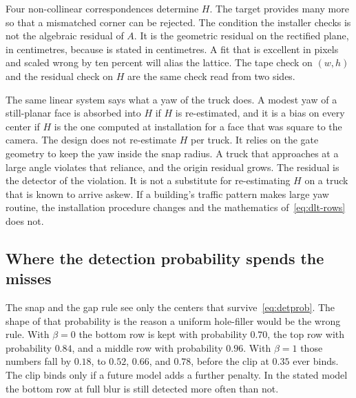 Four non-collinear correspondences determine $H$. The target provides many more so that a mismatched corner can be rejected. The condition the installer checks is not the algebraic residual of $A$. It is the geometric residual on the rectified plane, in centimetres, because  is stated in centimetres. A fit that is excellent in pixels and scaled wrong by ten percent will alias the lattice. The tape check on $(w,h)$ and the residual check on $H$ are the same check read from two sides.

The same linear system says what a yaw of the truck does. A modest yaw of a still-planar face is absorbed into $H$ if $H$ is re-estimated, and it is a bias on every center if $H$ is the one computed at installation for a face that was square to the camera. The design does not re-estimate $H$ per truck. It relies on the gate geometry to keep the yaw inside the snap radius. A truck that approaches at a large angle violates that reliance, and the origin residual grows. The residual is the detector of the violation. It is not a substitute for re-estimating $H$ on a truck that is known to arrive askew. If a building's traffic pattern makes large yaw routine, the installation procedure changes and the mathematics of~\eqref{eq:dlt-rows} does not.

\subsection{Where the detection probability spends the misses}
\label{sec:detprob-discuss}

The snap and the gap rule see only the centers that survive~\eqref{eq:detprob}. The shape of that probability is the reason a uniform hole-filler would be the wrong rule. With $\beta=0$ the bottom row is kept with probability $0.70$, the top row with probability $0.84$, and a middle row with probability $0.96$. With $\beta=1$ those numbers fall by $0.18$, to $0.52$, $0.66$, and $0.78$, before the clip at $0.35$ ever binds. The clip binds only if a future model adds a further penalty. In the stated model the bottom row at full blur is still detected more often than not.

